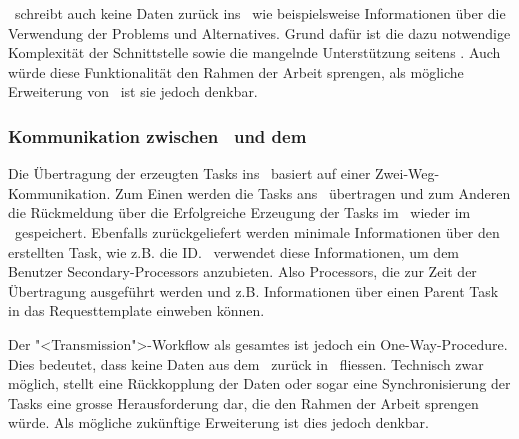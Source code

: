 				\eeppi\ schreibt auch keine Daten zurück ins \dks\ wie beispielsweise Informationen über die Verwendung der Problems und Alternatives.
				Grund dafür ist die dazu notwendige Komplexität der Schnittstelle sowie die mangelnde Unterstützung seitens \dks.
				Auch würde diese Funktionalität den Rahmen der Arbeit sprengen, als mögliche Erweiterung von \eeppi\ ist sie jedoch denkbar.
				
			
			\subsubsection{Kommunikation zwischen \eeppi\ und dem \ppt}
				Die Übertragung der erzeugten Tasks ins \ppt\ basiert auf einer Zwei-Weg-Kommunikation.
				Zum Einen werden die Tasks ans \ppt\ übertragen
				und zum Anderen die Rückmeldung über die Erfolgreiche Erzeugung der Tasks im \ppt\ wieder im \eeppi\ gespeichert.
				Ebenfalls zurückgeliefert werden minimale Informationen über den erstellten Task, 
				wie z.B. die ID. 
				\eeppi\ verwendet diese Informationen, um dem Benutzer Secondary-Processors anzubieten.
				Also Processors, die zur Zeit der Übertragung ausgeführt werden und z.B. Informationen über einen Parent Task in das Requesttemplate einweben können.
				
				Der "<Transmission">-Workflow als gesamtes ist jedoch ein One-Way-Procedure.
				Dies bedeutet, dass keine Daten aus dem \ppt\ zurück in \eeppi\ fliessen.
				Technisch zwar möglich, stellt eine Rückkopplung der Daten oder sogar eine Synchronisierung der Tasks eine grosse Herausforderung dar, 
				die den Rahmen der Arbeit sprengen würde.
				Als mögliche zukünftige Erweiterung ist dies jedoch denkbar.